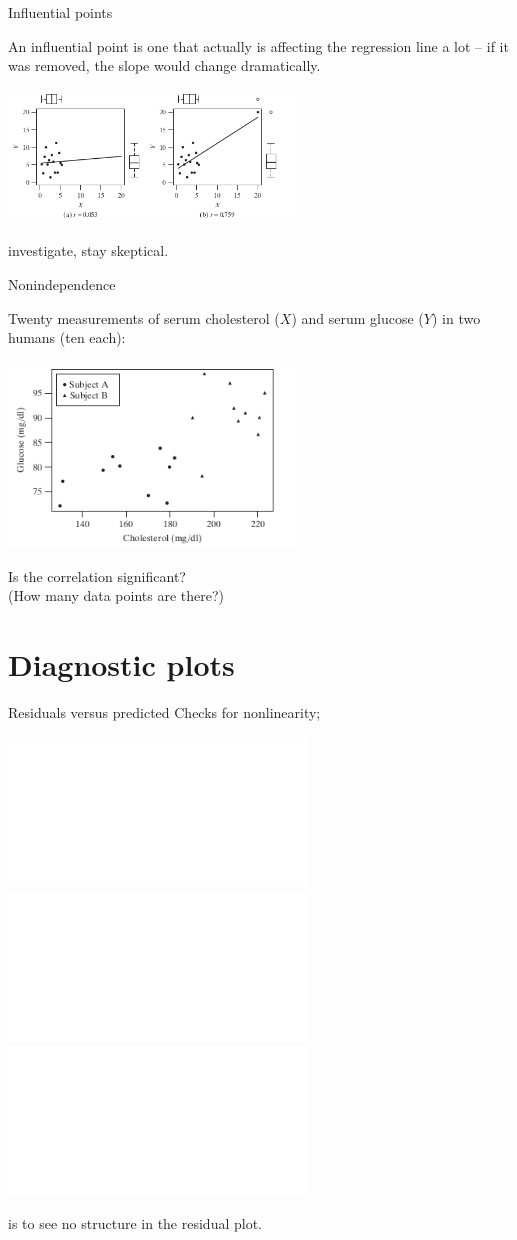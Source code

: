 \begin{frame}{Influential points}

    An \alert{influential point} is one that actually \alert{is} affecting the regression line a lot -- if it was removed, the slope would change dramatically.
    \begin{center}
        \includegraphics[width=3in]{fig-12-6-4.png}
    \end{center}

    \vspace{2em}

     investigate, stay skeptical.

\end{frame}


\begin{frame}{Nonindependence}

    Twenty measurements of serum cholesterol ($X$) and serum glucose ($Y$)
    in two humans (ten each):
    \begin{center}
        \includegraphics[width=3in]{fig-12-6-5.png}
    \end{center}

    Is the correlation significant? \\
    (How many data points are there?)

\end{frame}


\section{Diagnostic plots}


\begin{frame}{Residuals versus predicted}
    Checks for nonlinearity; 
    \begin{center}
        \includegraphics<1>{nonlinear2-resids.pdf}
        \includegraphics<2>[width=\textwidth]{usc-temps-fit-resid.pdf}
        \includegraphics<3>{hetersked-resids.pdf}
    \end{center}

     is to see \alert{no structure} in the residual plot.

\end{frame}



